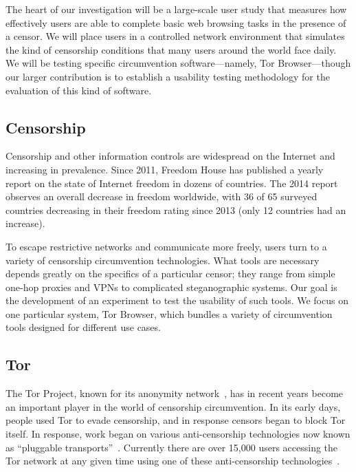 \documentclass[letterpaper,twocolumn,11pt]{article}
\begin{document}
The heart of our investigation will be a large-scale user study
that measures how effectively users are able to complete
basic web browsing tasks in the presence of a censor.
We will place users in a controlled network environment
that simulates the kind of censorship conditions that many
users around the world face daily.
We will be testing specific circumvention software---namely,
Tor Browser---though our larger contribution is to establish
a usability testing methodology for the evaluation
of this kind of software.

\subsection{Censorship} %

\indent \indent Censorship and other information controls
are widespread on the Internet and increasing in prevalence.
Since 2011, Freedom House has published a yearly report
on the state of Internet freedom in dozens of countries.
The 2014 report~\cite{freedom-on-the-net-2014} observes
an overall decrease in freedom worldwide,
with 36 of 65 surveyed countries decreasing in their freedom rating
since 2013 (only 12 countries had an increase).

To escape restrictive networks and communicate more freely,
users turn to a variety of censorship circumvention technologies.
What tools are necessary depends greatly on the specifics of
a particular censor;
they range from simple one-hop proxies and VPNs
to complicated steganographic systems.
Our goal is the development of an experiment
to test the usability of such tools.
We focus on one particular system,
Tor Browser, which bundles a variety of circumvention
tools designed for different use cases.

\subsection{Tor} 

\indent \indent The Tor Project, known for its anonymity network~\cite{tor-design},
has in recent years become an important player in the world of
censorship circumvention.
In its early days, people used Tor to evade censorship,
and in response censors began to block Tor itself.
In response, work began on various anti-censorship technologies
now known as ``pluggable transports''~\cite{pluggable-transports}.
Currently there are over 15,000 users accessing the Tor network
at any given time using one of these
anti-censorship technologies~\cite{userstats-bridge-country}.
\end{document}
